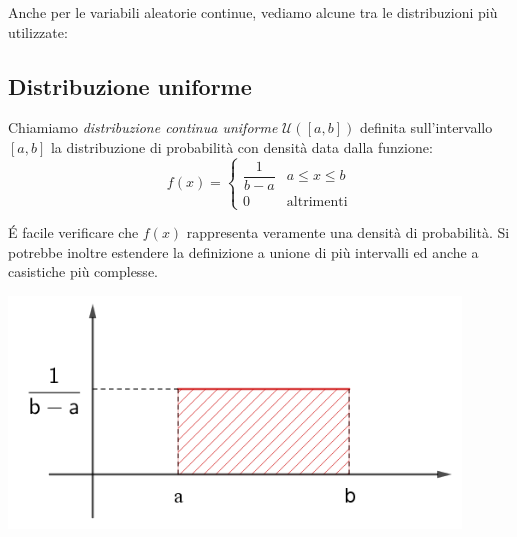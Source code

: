 Anche per le variabili aleatorie continue, vediamo alcune tra le distribuzioni più utilizzate:

\subsection{Distribuzione uniforme}

\begin{definizione} Chiamiamo \emph{distribuzione continua uniforme} \(\mathcal{U}([a,b])\) definita sull'intervallo \([a,b]\) la distribuzione di probabilità con densità data dalla funzione:
\[f(x) = \begin{cases} \dfrac{1}{b-a} & a\leq x\leq b \\
0 & \text{altrimenti}\end{cases}\]
\end{definizione}

\begin{minipage}[c]{.45\textwidth}
\'E facile verificare che \(f(x)\) rappresenta veramente una densità di probabilità. Si potrebbe inoltre estendere la definizione a unione di più intervalli ed anche a casistiche più complesse.
\end{minipage}
\begin{minipage}[c]{.55\textwidth}
\begin{center}
  \includegraphics[width=0.9\textwidth]{img/Uniforme_continua.png}
\end{center}
\end{minipage}

